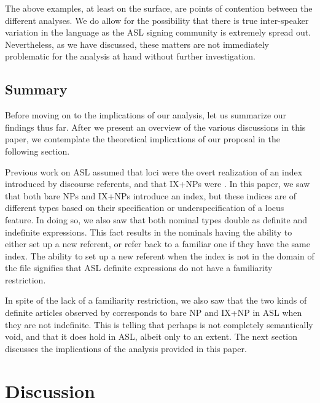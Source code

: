 \documentclass[output=paper,
modfonts
]{langscibook}
\begin{document}
The above examples, at least on the surface, are points of contention between the different analyses. We do allow for the possibility that there is true inter-speaker variation in the language as the ASL signing community is extremely spread out. Nevertheless, as we have discussed, these matters are not immediately problematic for the analysis at hand without further investigation. 

\subsection{Summary}

Before moving on to the implications of our analysis, let us summarize our findings thus far. After we present an overview of the various discussions in this paper, we contemplate the theoretical implications of our proposal in the following section. 

Previous work on ASL assumed that loci were the overt realization of an index introduced by discourse referents, and that IX+NPs were . In this paper, we saw that both bare NPs and IX+NPs introduce an index, but these indices are of different types based on their specification or underspecification of a locus feature. In doing so, we also saw that both nominal types double as definite and indefinite expressions. This fact results in the nominals having the ability to either set up a new referent, or refer back to a familiar one if they have the same index. The ability to set up a new referent when the index is not in the domain of the file signifies that ASL definite expressions do not have a familiarity restriction. 

In spite of the lack of a familiarity restriction, we also saw that the two kinds of definite articles observed by \citet{Schwarz2009,Schwarz2013} corresponds to bare NP and IX+NP in ASL when they are not indefinite. This is telling that perhaps  is not completely semantically void, and that it does hold in ASL, albeit only to an extent. The next section discusses the implications of the analysis provided \largerpage in this paper. 



\section{Discussion}\label{sec:irani:5}
\end{document}
